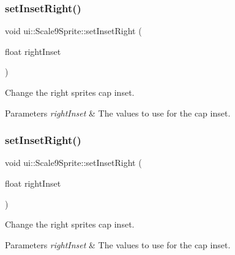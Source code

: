 \subsubsection{\texorpdfstring{set\+Inset\+Right()}{setInsetRight()}\hspace{0.1cm}{\footnotesize\ttfamily [1/2]}}
{\footnotesize\ttfamily void ui\+::\+Scale9\+Sprite\+::set\+Inset\+Right (\begin{DoxyParamCaption}\item[{float}]{right\+Inset }\end{DoxyParamCaption})}



Change the right sprite\textquotesingle{}s cap inset. 


\begin{DoxyParams}{Parameters}
{\em right\+Inset} & The values to use for the cap inset. \\
\hline
\end{DoxyParams}
\mbox{\label{classui_1_1Scale9Sprite_a7276d1dcf47579a368948f1cf84a3c41}} 
\subsubsection{\texorpdfstring{set\+Inset\+Right()}{setInsetRight()}\hspace{0.1cm}{\footnotesize\ttfamily [2/2]}}
{\footnotesize\ttfamily void ui\+::\+Scale9\+Sprite\+::set\+Inset\+Right (\begin{DoxyParamCaption}\item[{float}]{right\+Inset }\end{DoxyParamCaption})}



Change the right sprite\textquotesingle{}s cap inset. 


\begin{DoxyParams}{Parameters}
{\em right\+Inset} & The values to use for the cap inset. \\
\hline
\end{DoxyParams}
\mbox{\label{classui_1_1Scale9Sprite_a451123a4d8cd3c734aecdce03ad59ae0}} 
